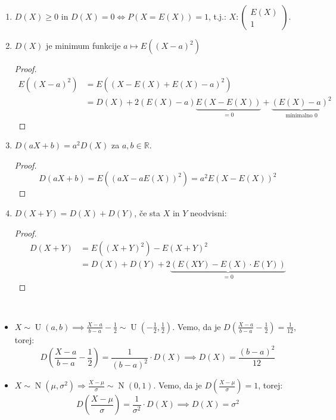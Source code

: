 \documentclass[12pt]{book}
\theoremstyle{definition}
\theoremstyle{plain}
\theoremstyle{plain}
\theoremstyle{plain}
\theoremstyle{plain}
\theoremstyle{remark}
\begin{document}
\begin{enumerate}
    \item $D(X) \geq 0 \text{ in } D(X) = 0 \iff P(X=E(X))=1$, t.j.: $X:\left(\begin{array}{c}E(X) \\ 1 \end{array}\right)$.
    \item $D(X)$ je minimum funkcije $a \mapsto E\left((X-a)^2\right)$
    \begin{proof}
        $$
        \begin{aligned}
            E\left((X-a)^2\right)&=E((X-E(X)+E(X)-a)^2) \\
            &=D(X)+2 (E(X)-a) \underbrace{E(X-E(X))}_{=0}+\underbrace{(E(X)-a)^2}_{\text{minimalno } 0}
        \end{aligned}
        $$
    \end{proof}
    \item $D(aX + b) = a^2 D(X)$ za $a, b\in \mathbb{R}$.
    \begin{proof}
        $$
        D(a X+b)=E\left((a X-a E(X))^2\right)=a^2 E\left(X-E(X)\right)^2
        $$
    \end{proof}
    \item $D(X+Y)=D(X)+D(Y)$, če sta $X$ in $Y$ neodvisni: 
    \begin{proof}
        $$
        \begin{aligned}
            D(X+Y)&=E\left((X+Y)^2\right)-E(X+Y)^2 \\
            &=D(X)+D(Y)+2 \underbrace{(E(X Y)-E(X) \cdot E(Y))}_{=0}    
        \end{aligned}
        $$
    \end{proof}
\end{enumerate}

\begin{zgled}
    ~

    \begin{itemize}
        \item $X \sim \operatorname{U}(a, b) \implies \frac{X-a}{b-a}-\frac{1}{2} \sim \operatorname{U}\left(-\frac{1}{2}, \frac{1}{2}\right)$. Vemo, da je $D\left(\frac{X-a}{b-a}-\frac{1}{2}\right)=\frac{1}{12}$, torej: 
        $$
        D\left(\frac{X-a}{b-a}-\frac{1}{2}\right) = \frac{1}{(b-a)^2} \cdot D(X) \implies D(X)=\frac{(b-a)^2}{12}
        $$
        \item $X \sim \operatorname{N}\left(\mu, \sigma^2\right) \Rightarrow \frac{X-\mu}{\sigma} \sim \operatorname{N}(0,1)$. Vemo, da je $D\left(\frac{X-\mu}{\sigma}\right)=1$, torej: 
        $$
        D\left(\frac{X-\mu}{\sigma}\right)=\frac{1}{\sigma^2} \cdot D(X) \implies D(X)=\sigma^2
        $$
    \end{itemize}
\end{zgled}
\end{document}
